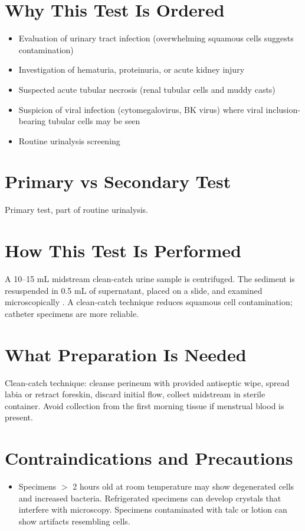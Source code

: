 \section*{Why This Test Is Ordered}
\begin{itemize}
  \item Evaluation of urinary tract infection (overwhelming squamous cells suggests contamination)
  \item Investigation of hematuria, proteinuria, or acute kidney injury
  \item Suspected acute tubular necrosis (renal tubular cells and muddy casts)
  \item Suspicion of viral infection (cytomegalovirus, BK virus) where viral inclusion-bearing tubular cells may be seen
  \item Routine urinalysis screening
\end{itemize}

\section*{Primary vs Secondary Test}
Primary test, part of routine urinalysis.

\section*{How This Test Is Performed}
A 10--15 mL midstream clean-catch urine sample is centrifuged. The sediment is resuspended in 0.5 mL of supernatant, placed on a slide, and examined microscopically \cite{strasinger2020urinalysis}. A clean-catch technique reduces squamous cell contamination; catheter specimens are more reliable.

\section*{What Preparation Is Needed}
Clean-catch technique: cleanse perineum with provided antiseptic wipe, spread labia or retract foreskin, discard initial flow, collect midstream in sterile container. Avoid collection from the first morning tissue if menstrual blood is present.

\section*{Contraindications and Precautions}
\begin{itemize}
  \item Specimens $>$ 2 hours old at room temperature may show degenerated cells and increased bacteria. Refrigerated specimens can develop crystals that interfere with microscopy. Specimens contaminated with talc or lotion can show artifacts resembling cells.
\end{itemize}
